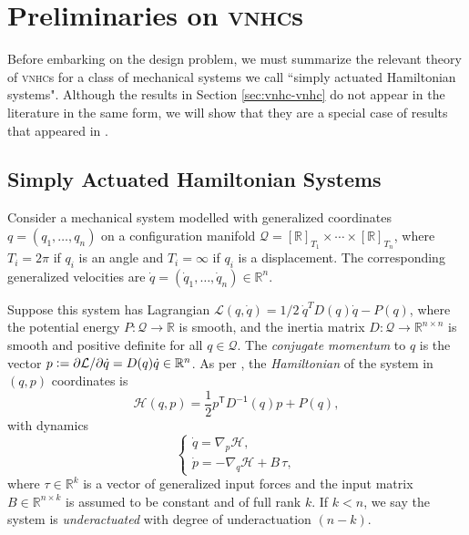 \documentclass[journal,twoside,web, twocolumn]{ieeecolor}
\newcommand*{\tpose}{^\mathsf{T}}
\newcommand*{\inv}{^\mathsf{-1}}
\newcommand*{\Rt}[1]{[\R]_{#1}}
\newcommand*{\R}{\mathbb{R}}
\newcommand*{\eqdef}{\vcentcolon=}
\newcommand*{\vnhc}{\textsc{vnhc}\xspace}
\newcommand*{\vnhcs}{\textsc{vnhc}s\xspace}
\begin{document}
\section{Preliminaries on \vnhcs}\label{sec:vnhc}
Before embarking on the design problem, we must summarize the relevant theory of \vnhcs for a class of mechanical systems we call ``simply actuated Hamiltonian systems". Although the results in Section \ref{sec:vnhc-vnhc} do not appear in the literature in the same form, we will show that they are a special case of results that appeared in \cite{hybrid_zero_dynamics_bipedal_nhvcs}.

\subsection{Simply Actuated Hamiltonian Systems} \label{sec:vnhc-sah}
Consider a mechanical system modelled with generalized coordinates  \(q = (q_1, \ldots, q_n)\) on a configuration manifold \(\mathcal{Q} = \Rt{T_1} \times \cdots \times \Rt{T_n}\), where \(T_i = 2\pi\) if \(q_i\) is an angle and \(T_i = \infty\) if \(q_i\) is a displacement. The corresponding generalized velocities are \(\dot{q} = (\dot{q}_1,\ldots,\dot{q}_n) \in \R^n\).

Suppose this system has Lagrangian \(\mathcal{L}(q,\dot{q}) = 1/2~\dot{q}^T D(q) \dot{q} - P(q)\), where the potential energy  \(P : \mathcal{Q} \rightarrow \mathbb{R}\)  is smooth, and the inertia matrix  \(D : \mathcal{Q} \rightarrow \mathbb{R}^{n \times n}\) is smooth and positive definite for all \(q \in \mathcal{Q}\). The \textit{conjugate momentum} to \(q\) is the vector \(p \eqdef \partial\mathcal{L}/\partial\dot{q} = D(q) \dot{q} \in \R^n\). As per \cite{landau_mechanics},  the \textit{Hamiltonian} of the system in \((q,p)\) coordinates is
\begin{equation}\label{eqn:hamiltonian}
    \mathcal{H}(q,p) = \frac{1}{2} p\tpose D\inv(q) p + P(q)
    ,
\end{equation}
with dynamics
\begin{equation}\label{eqn:hamiltonian-eom-general}
    \begin{cases}
        \dot{q} = \nabla_p\mathcal{H} 
        , \\
        \dot{p} = -\nabla_q\mathcal{H} + B \, \tau
        ,
    \end{cases}
\end{equation}
where \(\tau \in \R^k\) is a vector of generalized input forces and the input matrix \(B \in \R^{n \times k}\) is assumed to be constant and of full rank \(k\). If \(k < n\), we say the system is \textit{underactuated} with degree of underactuation \((n-k)\).
\end{document}
